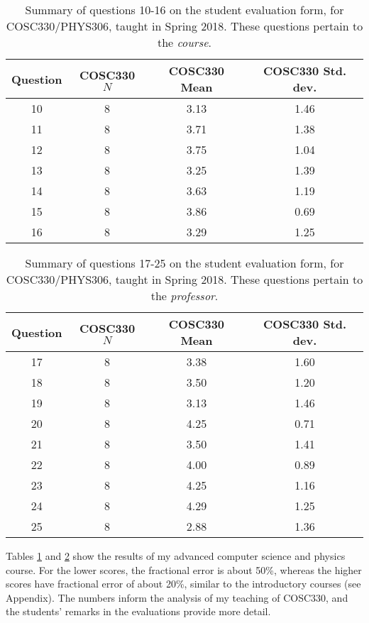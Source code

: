 \documentclass[../../main.tex]{subfiles}
\begin{document}
\begin{table}
\small
\centering
\begin{tabular}{| c | c | c | c |}
\hline \hline
Question & COSC330 $N$ & COSC330 Mean & COSC330 Std. dev. \\ \hline
10 & 8 & 3.13 & 1.46 \\ \hline
11 & 8 & 3.71 & 1.38 \\ \hline
12 & 8 & 3.75 & 1.04 \\ \hline
13 & 8 & 3.25 & 1.39 \\ \hline
14 & 8 & 3.63 & 1.19 \\ \hline
15 & 8 & 3.86 & 0.69 \\ \hline
16 & 8 & 3.29 & 1.25 \\ \hline
\hline
\end{tabular}
\caption{\label{tab:courses:adv_eval_1} Summary of questions 10-16 on the student evaluation form, for COSC330/PHYS306, taught in Spring 2018.  These questions pertain to the \textit{course}.}
\end{table}

\begin{table}
\centering
\begin{tabular}{| c | c | c | c |}
\hline \hline
Question & COSC330 $N$ & COSC330 Mean & COSC330 Std. dev. \\ \hline
17 & 8 & 3.38 & 1.60 \\ \hline
18 & 8 & 3.50 & 1.20 \\ \hline
19 & 8 & 3.13 & 1.46 \\ \hline
20 & 8 & 4.25 & 0.71 \\ \hline
21 & 8 & 3.50 & 1.41 \\ \hline
22 & 8 & 4.00 & 0.89 \\ \hline
23 & 8 & 4.25 & 1.16 \\ \hline
24 & 8 & 4.29 & 1.25 \\ \hline
25 & 8 & 2.88 & 1.36 \\ \hline
\hline
\end{tabular}
\caption{\label{tab:courses:adv_eval_2} Summary of questions 17-25 on the student evaluation form, for COSC330/PHYS306, taught in Spring 2018.  These questions pertain to the \textit{professor}.}
\end{table}

Tables \ref{tab:courses:adv_eval_1} and \ref{tab:courses:adv_eval_2} show the results of my advanced computer science and physics course.  For the lower scores, the fractional error is about 50\%, whereas the higher scores have fractional error of about 20\%, similar to the introductory courses (see Appendix). The numbers inform the analysis of my teaching of COSC330, and the students' remarks in the evaluations provide more detail. \\ \hspace{0.1cm}
\end{document}
